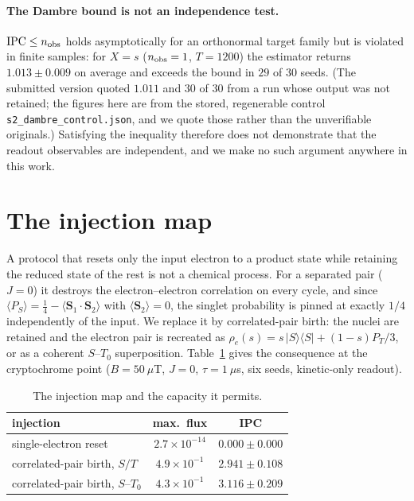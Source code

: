 \documentclass[aps,prx,reprint,superscriptaddress,nofootinbib,floatfix]{revtex4-2}
\begin{document}
\paragraph*{The Dambre bound is not an independence test.} $\mathrm{IPC}\le
n_{\rm obs}$ holds asymptotically for an orthonormal target family but is violated in
finite samples: for $X=s$ ($n_{\rm obs}=1$, $T=1200$) the estimator returns
$1.013\pm0.009$ on average and exceeds the bound in $29$ of $30$ seeds. (The
submitted version quoted $1.011$ and $30$ of $30$ from a run whose output was not
retained; the figures here are from the stored, regenerable control
\texttt{s2\_dambre\_control.json}, and we quote those rather than the unverifiable
originals.) Satisfying the inequality
therefore does not demonstrate that the readout observables are independent, and we
make no such argument anywhere in this work.

\section{The injection map}
\label{sec:injection}
A protocol that resets only the input electron to a product state while retaining the
reduced state of the rest is not a chemical process. For a separated pair ($J=0$) it
destroys the electron--electron correlation on every cycle, and since
$\langle P_S\rangle=\tfrac14-\langle \bm S_1\!\cdot\!\bm S_2\rangle$ with
$\langle \bm S_2\rangle=0$, the singlet probability is pinned at exactly $1/4$
independently of the input. We replace it by correlated-pair birth: the nuclei are
retained and the electron pair is recreated as
$\rho_e(s)=s\,|S\rangle\langle S|+(1-s)P_T/3$, or as a coherent $S$--$T_0$
superposition. Table~\ref{tab:inject} gives the consequence at the cryptochrome point
($B=50~\mu$T, $J=0$, $\tau=1~\mu$s, six seeds, kinetic-only readout).

\begin{table}[H]
\caption{\label{tab:inject}The injection map and the capacity it permits.}
\begin{ruledtabular}
\begin{tabular}{lcc}
injection & max.\ flux & IPC \\
\hline
single-electron reset & $2.7\times10^{-14}$ & $0.000\pm0.000$ \\
correlated-pair birth, $S/T$ & $4.9\times10^{-1}$ & $2.941\pm0.108$ \\
correlated-pair birth, $S$--$T_0$ & $4.3\times10^{-1}$ & $3.116\pm0.209$ \\
\end{tabular}
\end{ruledtabular}
\end{table}
\end{document}
